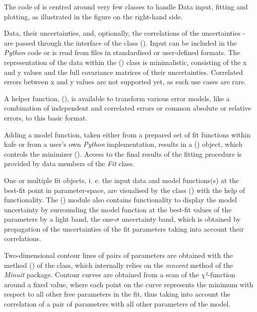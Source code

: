 \documentclass[a4paper,10pt,english]{sphinxmanual}
\begin{document}
The code of  is centred around very few classes to handle Data input,
fitting and plotting, as illustrated in the figure on the right-hand side.

Data, their uncertainties, and, optionally, the correlations of the
uncertainties - are passed through the interface of the  class
{\hyperref[index:kafe.dataset.Dataset]{\emph{}}} (). Input can be included in the \emph{Python} code
or is read from files in standardised or user-defined formats. The representation
of the data within the {\hyperref[index:kafe.dataset.Dataset]{\emph{}}} () class is minimalistic,
consisting of the x and y values and the full covariance matrices of their
uncertainties. Correlated errors between x and y values are not
supported yet, as such use cases are rare.

A helper function, {\hyperref[index:kafe.dataset_tools.build_dataset]{\emph{}}} (), is available
to transform various error models, like a combination of independent
and correlated errors or common absolute or relative errors, to this
basic format.

Adding a model function, taken either from a prepared set of fit
functions within kafe or from a user's own \emph{Python} implementation,
results in a {\hyperref[index:kafe.fit.Fit]{\emph{}}} () object, which controls the
minimizer {\hyperref[index:kafe.minuit.Minuit]{\emph{}}} (). Access to the final
results of the fitting procedure is provided by data members of
the \emph{Fit} class.

One or multiple fit objects, i. e. the input data and model
functions(s) at the best-fit point in parameter-space, are
visualised by the class {\hyperref[index:kafe.plot.Plot]{\emph{}}} () with the help
of  functionality. The {\hyperref[index:module-plot]{\emph{}}} () module
also contains functionality to display the model uncertainty by
surrounding the model function at the best-fit values of the parameters
by a light band, the one-\(\sigma\) uncertainty band, which is obtained by
propagation of the uncertainties of the fit parameters taking
into account their correlations.

Two-dimensional contour lines of pairs of parameters
are obtained with the method {\hyperref[index:kafe.fit.Fit.plot_contour]{\emph{}}} ()
of the  class, which internally relies on the
\emph{mncont} method of the \emph{Minuit} package. Contour curves are
obtained from a scan of the \(\chi\)²-function around a fixed value,
where each point on the curve represents the minimum with
respect to all other free parameters in the fit, thus taking
into account the correlation of a pair of parameters with all
other parameters of the model.
\end{document}
